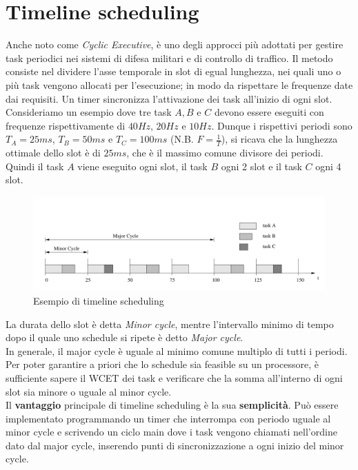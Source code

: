 \documentclass[12pt,openany,onesided]{book}
\begin{document}
\section{Timeline scheduling}
Anche noto come \textit{Cyclic Executive}, è uno degli approcci più adottati per gestire task periodici nei sistemi di difesa militari e di controllo di traffico.
Il metodo consiste nel dividere l'asse temporale in slot di egual lunghezza, nei quali uno o più task vengono allocati per l'esecuzione; in modo da rispettare le frequenze date dai requisiti.
Un timer sincronizza l'attivazione dei task all'inizio di ogni slot.\\
Consideriamo un esempio dove tre task $A,B$ e $C$ devono essere eseguiti con frequenze rispettivamente di $40Hz$, $20Hz$ e $10Hz$.
Dunque i rispettivi periodi sono $T_A=25ms$, $T_B=50ms$ e $T_C=100ms$ (N.B. $F=\frac{1}{T}$), si ricava che la lunghezza ottimale dello slot è di 
$25ms$, che è il massimo comune divisore dei periodi. Quindi il task $A$ viene eseguito ogni slot, il task $B$ ogni 2 slot e il task $C$ ogni 4 slot.
\begin{figure}[H]
    \centering
    \includegraphics[width=\textwidth]{pictures/timelineScheduling.png}
    \caption{Esempio di timeline scheduling}
\end{figure}
\noindent La durata dello slot è detta \textit{Minor cycle}, mentre l'intervallo minimo di tempo dopo il quale uno schedule si ripete è detto \textit{Major cycle}.
\\
In generale, il major cycle è uguale al minimo comune multiplo di tutti i periodi. Per poter garantire a priori che lo schedule sia feasible su un processore,
è sufficiente sapere il WCET dei task e verificare che la somma all'interno di ogni slot sia minore o uguale al minor cycle.
\\
Il \textbf{vantaggio} principale di timeline scheduling è la sua \textbf{semplicità}. Può essere implementato programmando un timer che interrompa con periodo uguale al minor cycle
e scrivendo un ciclo main dove i task vengono chiamati nell'ordine dato dal major cycle, inserendo punti di sincronizzazione a ogni inizio del minor cycle.
\end{document}
